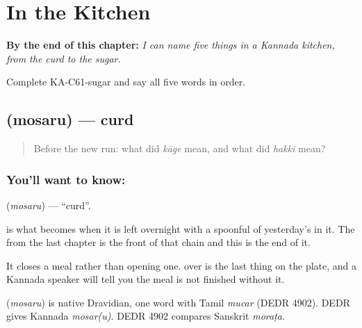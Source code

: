 
\chapter{In the Kitchen}
\label{ch:ka-kitchen}

\begin{chapteropening}
\textbf{By the end of this chapter:} \emph{I can name five things in a Kannada kitchen, from the curd to the sugar.}

Complete KA-C61-sugar and say all five words in order.
\end{chapteropening}

\section[\texorpdfstring{\kn{ಮೊಸರು} (mosaru)}{ಮೊಸರು (mosaru)}]{ (mosaru) — curd}

\label{lesson:KA-C61-curd}



\begin{quote}
Before the new run: what did \emph{kāge} mean, and what did \emph{hakki} mean?
\end{quote}

\subsection*{You'll want to know: }
\textbf{} (\emph{mosaru}) — \textquotedblleft{}curd\textquotedblright{}.

 is what  becomes when it is left overnight with a spoonful of yesterday's  in it. The  from the last chapter is the front of that chain and this is the end of it.

It closes a meal rather than opening one.  over  is the last thing on the plate, and a Kannada speaker will tell you the meal is not finished without it.

\begin{cousinweb}
\textbf{} (\emph{mosaru}) is native Dravidian, one word with Tamil \emph{mucar} (DEDR 4902). DEDR gives Kannada \emph{mosar(u)}. DEDR 4902 compares Sanskrit \emph{moraṭa}.
\end{cousinweb}

